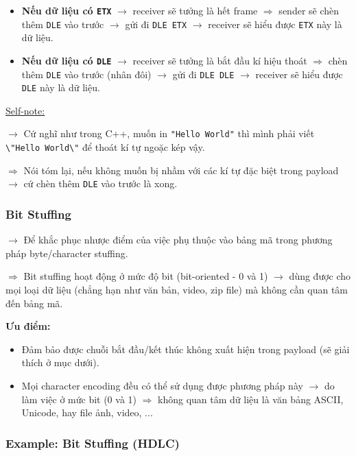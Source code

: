 \begin{itemize}
    \item \textbf{Nếu dữ liệu có \texttt{ETX}} $\rightarrow$ receiver sẽ tưởng là hết frame $\Rightarrow$ sender sẽ chèn thêm \texttt{DLE} vào trước $\rightarrow$ gửi đi \texttt{DLE ETX} $\rightarrow$ receiver sẽ hiểu được \texttt{ETX} này là dữ liệu.
    \item \textbf{Nếu dữ liệu có \texttt{DLE}} $\rightarrow$ receiver sẽ tưởng là bắt đầu kí hiệu thoát $\Rightarrow$ chèn thêm \texttt{DLE} vào trước (nhân đôi) $\rightarrow$ gửi đi \texttt{DLE DLE} $\rightarrow$ receiver sẽ hiểu được \texttt{DLE} này là dữ liệu.
\end{itemize}
\medskip

\noindent
\underline{Self-note:}
\medskip

\noindent
$\rightarrow$ Cứ nghĩ như trong C++, muốn in \texttt{"Hello World"} thì mình phải viết \texttt{\textbackslash"Hello World\textbackslash"} để thoát kí tự ngoặc kép vậy.

$\Rightarrow$ Nói tóm lại, nếu không muốn bị nhầm với các kí tự đặc biệt trong payload $\rightarrow$ cứ chèn thêm \texttt{DLE} vào trước là xong.
\medskip

\subsubsection{Bit Stuffing}

\noindent
$\rightarrow$ Để khắc phục nhược điểm của việc phụ thuộc vào bảng mã trong phương pháp byte/character stuffing.

$\Rightarrow$ Bit stuffing hoạt động ở mức độ bit (bit-oriented - 0 và 1) $\rightarrow$ dùng được cho mọi loại dữ liệu (chẳng hạn như văn bản, video, zip file) mà không cần quan tâm đến bảng mã.
\medskip

\noindent
\textbf{Ưu điểm:}

\begin{itemize}
    \item Đảm bảo được chuỗi bắt đầu/kết thúc không xuất hiện trong payload (sẽ giải thích ở mục dưới).
    \item Mọi character encoding đều có thể sử dụng được phương pháp này $\rightarrow$ do làm việc ở mức bit (0 và 1) $\Rightarrow$ không quan tâm dữ liệu là văn bảng ASCII, Unicode, hay file ảnh, video, ...
\end{itemize}
\medskip

\subsubsection{Example: Bit Stuffing (HDLC)}

